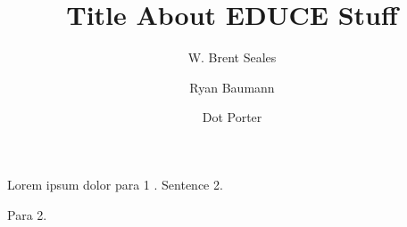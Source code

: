\documentclass[12pt]{article}
\begin{document}
\title{Title About EDUCE Stuff}
\author{W. Brent Seales
\and Ryan Baumann \\
\and Dot Porter}
\date{}

\maketitle

\section*{}

Lorem ipsum dolor para 1 \citep{Brown:2000p6405}. Sentence 2.

Para 2.

\section*{}

\section*{}



\end{document}
